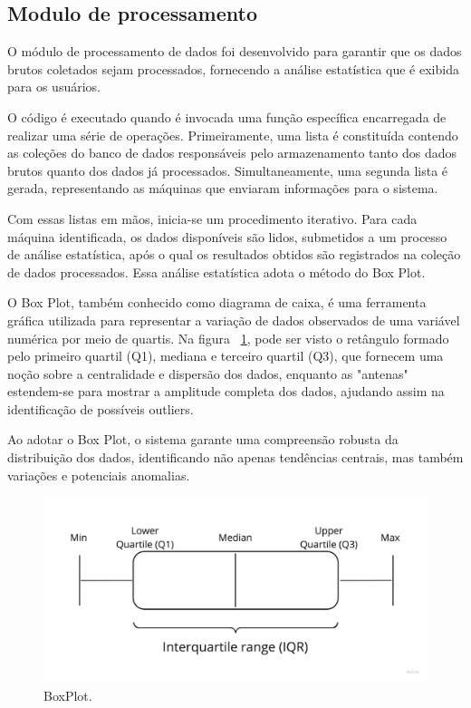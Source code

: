 \subsection{Modulo de processamento}\label{subsec:moduloProcessamento}
O módulo de processamento de dados foi desenvolvido para garantir que os dados brutos coletados sejam processados, fornecendo a análise estatística que é exibida para os usuários.

O código é executado quando é invocada uma função específica encarregada de realizar uma série de operações. Primeiramente, uma lista é constituída contendo as coleções do banco de dados responsáveis pelo armazenamento tanto dos dados brutos quanto dos dados já processados. Simultaneamente, uma segunda lista é gerada, representando as máquinas que enviaram informações para o sistema.

Com essas listas em mãos, inicia-se um procedimento iterativo. Para cada máquina identificada, os dados disponíveis são lidos, submetidos a um processo de análise estatística, após o qual os resultados obtidos são registrados na coleção de dados processados. Essa análise estatística adota o método do Box Plot.

O Box Plot, também conhecido como diagrama de caixa, é uma ferramenta gráfica utilizada para representar a variação de dados observados de uma variável numérica por meio de quartis. Na figura ~\ref{fig:boxplot}, pode ser visto o retângulo formado pelo primeiro quartil (Q1), mediana e terceiro quartil (Q3), que fornecem uma noção sobre a centralidade e dispersão dos dados, enquanto as "antenas" estendem-se para mostrar a amplitude completa dos dados, ajudando assim na identificação de possíveis outliers.

Ao adotar o Box Plot, o sistema garante uma compreensão robusta da distribuição dos dados, identificando não apenas tendências centrais, mas também variações e potenciais anomalias.

\begin{figure}[htbp]
	\centering
	\includegraphics[width=\textwidth]{images/boxplot.jpg}
	\caption{BoxPlot.}
	\label{fig:boxplot}
\end{figure}


